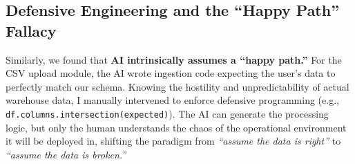 \subsection{Defensive Engineering and the ``Happy Path'' Fallacy}

Similarly, we found that \textbf{AI intrinsically assumes a ``happy path.''} For the CSV upload module, the AI wrote ingestion code expecting the user's data to perfectly match our schema. Knowing the hostility and unpredictability of actual warehouse data, I manually intervened to enforce defensive programming (e.g., \texttt{df.columns.intersection(expected)}). The AI can generate the processing logic, but only the human understands the chaos of the operational environment it will be deployed in, shifting the paradigm from \textit{``assume the data is right''} to \textit{``assume the data is broken.''}

